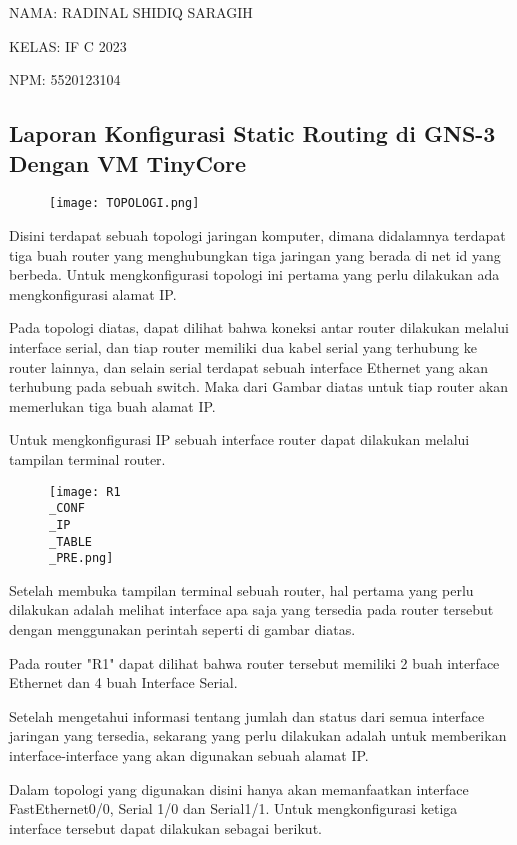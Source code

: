 \documentclass[12pt, a4paper]{article}
\date{}
\begin{document}
    NAMA: RADINAL SHIDIQ SARAGIH

    KELAS: IF C 2023

    NPM: 5520123104

  \begin{center}
    \section*{Laporan Konfigurasi Static Routing di GNS-3 Dengan VM TinyCore}
  \end{center}

  \begin{figure}[h]
      \centering
      \texttt{[image: TOPOLOGI.png]}
  \end{figure}

  Disini terdapat sebuah topologi jaringan komputer, dimana didalamnya
  terdapat tiga buah router yang menghubungkan tiga jaringan yang berada
  di net id yang berbeda. Untuk mengkonfigurasi topologi ini pertama yang
  perlu dilakukan ada mengkonfigurasi alamat IP.

  Pada topologi diatas, dapat dilihat bahwa koneksi antar router
  dilakukan melalui interface serial, dan tiap router memiliki dua kabel
  serial yang terhubung ke router lainnya, dan selain serial terdapat
  sebuah interface Ethernet yang akan terhubung
  pada sebuah switch. Maka dari Gambar diatas untuk tiap router akan
  memerlukan tiga buah alamat IP.

  Untuk mengkonfigurasi IP sebuah interface router dapat dilakukan melalui
  tampilan terminal router.
  
  \begin{figure}[h]
      \centering
      \texttt{[image: R1\\\_CONF\\\_IP\\\_TABLE\\\_PRE.png]}
  \end{figure}

  Setelah membuka tampilan terminal sebuah router, hal pertama yang
  perlu dilakukan adalah melihat interface apa saja yang tersedia pada router
  tersebut dengan menggunakan perintah seperti di gambar diatas.

  Pada router "R1" dapat dilihat bahwa router tersebut memiliki 2 buah 
  interface Ethernet dan 4 buah Interface Serial.

  Setelah mengetahui informasi tentang jumlah dan status dari semua
  interface jaringan yang tersedia, sekarang yang perlu dilakukan adalah
  untuk memberikan interface-interface yang akan digunakan sebuah alamat
  IP.

  Dalam topologi yang digunakan disini hanya akan memanfaatkan interface 
  FastEthernet0/0, Serial 1/0 dan Serial1/1. Untuk mengkonfigurasi ketiga
  interface tersebut dapat dilakukan sebagai berikut.
\end{document}
